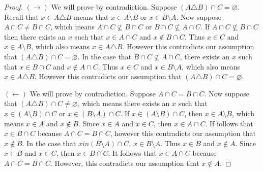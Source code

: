\documentclass{article}
\begin{document}
\begin{proof}
$(\rightarrow)$ We will prove by contradiction. Suppose $(A \triangle B) \cap C = \varnothing$. Recall that $x \in A \triangle B$ means that $x \in A \setminus B$ or $x \in B \setminus A$. Now suppose $A \cap C \neq B \cap C$, which means $A \cap C \not\subseteq B \cap C$ or $B \cap C \not\subseteq A \cap C$. If $A \cap C \not\subseteq B \cap C$ then there exists an $x$ such that $x \in A \cap C$ and $x \notin B \cap C$. Thus $x \in C$ and $x \in A \setminus B$, which also means $x \in A \triangle B$. However this contradicts our assumption that $(A \triangle B) \cap C = \varnothing$. In the case that $B \cap C \not\subseteq A \cap C$, there exists an $x$ such that $x \in B \cap C$ and $x \notin A \cap C$. Thus $x \in C$ and $x \in B \setminus A$, which also means $x \in A \triangle B$. However this contradicts our assumption that $(A \triangle B) \cap C = \varnothing$.

$(\leftarrow)$ We will prove by contradiction. Suppose $A \cap C = B \cap C$. Now suppose that $(A \triangle B) \cap C \neq \varnothing$, which means there exists an $x$ such that $x \in (A \setminus B) \cap C$ or $x \in (B \setminus A) \cap C$. If $ x \in (A \setminus B) \cap C$, then $x \in A \setminus B$, which means $x \in A$ and $x \notin B$. Since $x \in A$ and $x \in C$, then $x \in A \cap C$. If follows that $x \in B \cap C$ because $A \cap C = B \cap C$, however this contradicts our assumption that $x \notin B$. In the case that $x in (B \setminus A) \cap C$, $x \in B \setminus A$. Thus $x \in B$ and $x \notin A$. Since $x \in B$ and $x \in C$, then $x \in B \cap C$. It follows that $x \in A \cap C$ because $A \cap C = B \cap C$. However, this contradicts our assumption that $x \notin A$. 
\end{proof}
\end{document}
